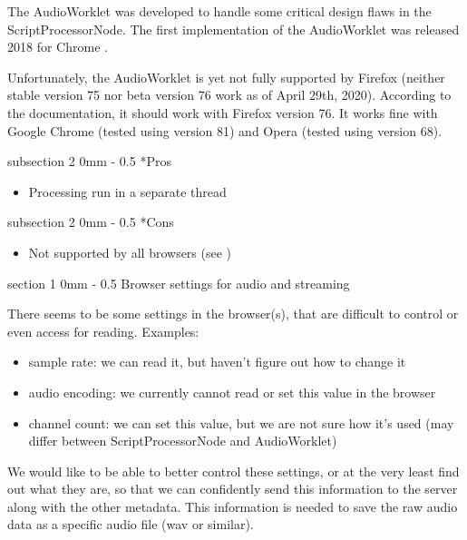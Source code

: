 \documentclass[11pt, a4paper, twoside]{article}
\makeatletter
\renewcommand{\subsection}{\@startsection
   {subsection}%
   {2}%
   {0mm}%
   {-\baselineskip}%
   {0.5\baselineskip}%
   {\bfseries\sffamily\large}}%
\renewcommand{\section}{\@startsection
   {section}%
   {1}%
   {0mm}%
   {-\baselineskip}%
   {0.5\baselineskip}%
   {\bfseries\sffamily\Large}}%
\makeatother
\begin{document}
The AudioWorklet was developed to handle some critical design flaws in the ScriptProcessorNode. The first implementation of the AudioWorklet was released 2018 for Chrome \cite{icmc}.

Unfortunately, the AudioWorklet is yet not fully supported by Firefox (neither stable version 75 nor beta version 76 work as of April 29th, 2020). According to the documentation, it should work with Firefox version 76. It works fine with Google Chrome (tested using version 81) and Opera (tested using version 68).


\subsection*{Pros}
\begin{itemize}
\item Processing run in a separate thread
  \end{itemize}

\subsection*{Cons}
\begin{itemize}
\item Not supported by all browsers (see \cite{audioworklet})
\end{itemize}




\section{Browser settings for audio and streaming}

There seems to be some settings in the browser(s), that are difficult to control or even access for reading. Examples:

\begin{itemize}
\item sample rate: we can read it, but haven't figure out how to change it
\item audio encoding: we currently cannot read or set this value in the browser
\item channel count: we can set this value, but we are not sure how it's used (may differ between ScriptProcessorNode and AudioWorklet)
\end{itemize}

We would like to be able to better control these settings, or at the very least find out what they are, so that we can confidently send this information to the server along with the other metadata. This information is needed to save the raw audio data as a specific audio file (wav or similar).
\end{document}
